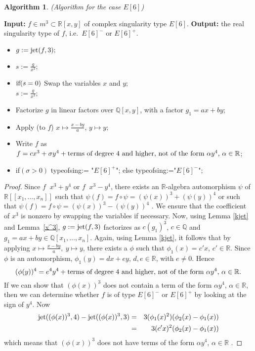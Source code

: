\documentclass{amsproc}
\DeclareMathOperator{\requiv}{\overset{r}{\sim}}
\begin{document}
\newtheorem{E[6]}[kjet]{Algorithm}
\begin{E[6]}(Algorithm for the case $E[6]$)
\end{E[6]}
\noindent\textnormal{\bf Input:} $f\in m^3\subset\mathbb R[x,y]$ of complex singularity type $E[6]$.\newline
\textnormal{\bf Output:} the real singularity type of $f$, i.e.~$E[6]^-$ or $E[6]^+$.
\begin{itemize}
\item $g:= \textnormal{jet}(f,3);$
\item $s:= \frac{g}{x^3};$
\item $\textnormal{if}(s=0)$\newline
\phantom{}\quad Swap the variables $x$ and $y$;\\
\phantom{}\quad $s:=\frac{g}{x^3}$;
\item Factorize $g$ in linear factors over $\mathbb Q[x,y]$, with a factor $g_1=ax+by$;
\item Apply (to $f$) $x\mapsto \frac{x-by}{a}$, $y\mapsto y$;
\item Write $f$ as $f=cx^3+\sigma y^4+\textnormal{terms of degree $4$ and higher, not of the form $\alpha y^4$, $\alpha\in\mathbb R$}$;
\item \textnormal{if}$(\sigma>0)$\newline
\phantom{}\quad typeofsing:= "$E[6]^+$";\newline
\phantom{} else\newline
\phantom{}\quad typeofsing:="$E[6]^-$";
\end{itemize}
\begin{proof}
Since $f\requiv x^3+y^4$ or $f\requiv x^3-y^4$, there exists an $\mathbb
R$-algebra automorphism $\psi$ of $\mathbb R[[x_1,\ldots,x_n]]$ such that
$\psi(f)=f\circ\psi=(\psi(x))^3+(\psi(y))^4$ or such that
$\psi(f)=f\circ\psi=(\psi(x))^3-(\psi(y))^4$ . We ensure that the coefficient of
$x^3$ is nonzero by swapping the variables if necessary. Now, using Lemma
\ref{kjet} and Lemma~\ref{x^3}, $g:=\textnormal{jet}(f,3)$ factorizes as
$c(g_1)^3$, $c\in\mathbb Q$ and $g_1=ax+by\in\mathbb Q[x_1,\ldots,x_n]$. Again,
using Lemma \ref{kjet}, it follows that by applying $x\mapsto\frac{x-by}{a},\
y\mapsto y$, there exists a $\phi$ such that $\phi_1(x)=c'x$, $c'\in\mathbb R$. Since $\phi$ is an automorphism, $\phi_1(y)=dx+ey$, $d,e\in\mathbb R$, with $e\neq 0$. Hence
\begin{equation*}
(\phi(y))^4=e^4y^4+\textnormal{terms of degree 4 and higher, not of the form $\alpha y^4$, $\alpha\in\mathbb R$.}
\end{equation*}
If we can show that $(\phi(x))^3$ does not contain a term of the form $\alpha y^4$, $\alpha\in\mathbb R$, then we can determine whether $f$ is of type $E[6]^-$ or $E[6]^+$ by looking at the sign of $y^4$. Now 
\begin{eqnarray*}
\textnormal{jet}((\phi(x))^3,4)-\textnormal{jet}((\phi(x))^3,3)&=&3(\phi_1(x)^2)(\phi_2(x)-\phi_1(x))\\&=&3(c'x)^2(\phi_2(x)-\phi_1(x))
\end{eqnarray*}
 which means that $(\phi(x))^3$ does not have terms of the form $\alpha y^4$, $\alpha\in\mathbb R$ .   
\end{proof}
\end{document}
